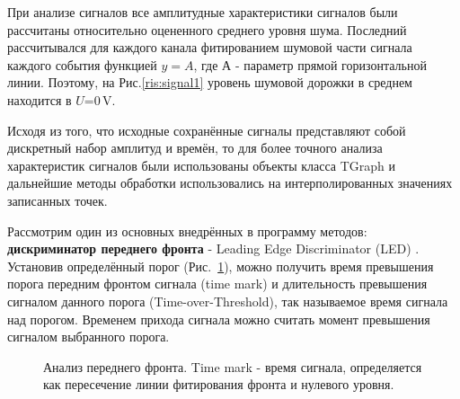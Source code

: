 При анализе сигналов все амплитудные характеристики сигналов были рассчитаны относительно оцененного среднего уровня шума. Последний рассчитывался для каждого канала фитированием шумовой части сигнала каждого события функцией $y=A$, где А - параметр прямой горизонтальной линии. Поэтому, на Рис.\ref{ris:signal1} уровень шумовой дорожки в среднем находится в $U$=0\,V.


Исходя из того, что исходные сохранённые сигналы представляют собой дискретный набор амплитуд и времён, то для более точного анализа характеристик сигналов были использованы объекты класса TGraph и дальнейшие методы обработки использовались на интерполированных значениях записанных точек.

Рассмотрим один из основных внедрённых в программу методов: \textbf{дискриминатор переднего фронта} - Leading Edge Discriminator (LED) \cite{methods}.  Установив определённый порог (Рис.~\ref{ris:LED}), можно получить время превышения порога передним фронтом сигнала (time mark) и длительность превышения сигналом данного порога (Time-over-Threshold), так называемое время сигнала над порогом. %
Временем прихода сигнала можно считать момент превышения сигналом выбранного порога. 

\begin{figure}[!h]
	\caption{Анализ переднего фронта. Time mark - время сигнала, определяется как пересечение линии фитирования фронта и нулевого уровня.}
	\label{ris:LED}
\end{figure}

